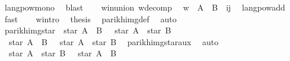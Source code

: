 \begin{isabellebody}
\ langpow{\isacharunderscore}{\kern0pt}mono\ \isamarkupfalse%
\ blast\isanewline
\ \ \isamarkupfalse%
\ w{}{\isacharunderscore}{\kern0pt}in{\isacharunderscore}{\kern0pt}union\ w{\isacharunderscore}{\kern0pt}decomp\ \isamarkupfalse%
\ {\isachardoublequoteopen}w\ {\isasymin}\ {\isacharparenleft}{\kern0pt}A\ {\isasymunion}\ B{\isacharparenright}{\kern0pt}\ {\isacharcircum}{\kern0pt}{\isacharcircum}{\kern0pt}\ {\isacharparenleft}{\kern0pt}i{\isacharplus}{\kern0pt}j{\isacharparenright}{\kern0pt}{\isachardoublequoteclose}\ \isamarkupfalse%
\ lang{\isacharunderscore}{\kern0pt}pow{\isacharunderscore}{\kern0pt}add\ \isamarkupfalse%
\ fast\isanewline
\ \ \isamarkupfalse%
\ w{\isacharunderscore}{\kern0pt}intro\ \isamarkupfalse%
\ {\isacharquery}{\kern0pt}thesis\ \isamarkupfalse%
\ parikh{\isacharunderscore}{\kern0pt}img{\isacharunderscore}{\kern0pt}def\ \isamarkupfalse%
\ auto\isanewline
{}\isamarkupfalse%
%
\endisatagproof
{\isafoldproof}%
%
\isadelimproof
\isanewline
%
\endisadelimproof
\isanewline
\isanewline
{}\isamarkupfalse%
\ parikh{\isacharunderscore}{\kern0pt}img{\isacharunderscore}{\kern0pt}star{\isacharcolon}{\kern0pt}\ {\isachardoublequoteopen}{\isasymPsi}\ {\isacharparenleft}{\kern0pt}star\ {\isacharparenleft}{\kern0pt}A\ {\isasymunion}\ B{\isacharparenright}{\kern0pt}{\isacharparenright}{\kern0pt}\ {\isacharequal}{\kern0pt}\ {\isasymPsi}\ {\isacharparenleft}{\kern0pt}star\ A\ {\isacharat}{\kern0pt}{\isacharat}{\kern0pt}\ star\ B{\isacharparenright}{\kern0pt}{\isachardoublequoteclose}\isanewline
%
\isadelimproof
%
\endisadelimproof
%
\isatagproof
{}\isamarkupfalse%
\isanewline
\ \ \isamarkupfalse%
\ {\isachardoublequoteopen}{\isasymPsi}\ {\isacharparenleft}{\kern0pt}star\ {\isacharparenleft}{\kern0pt}A\ {\isasymunion}\ B{\isacharparenright}{\kern0pt}{\isacharparenright}{\kern0pt}\ {\isasymsubseteq}\ {\isasymPsi}\ {\isacharparenleft}{\kern0pt}star\ A\ {\isacharat}{\kern0pt}{\isacharat}{\kern0pt}\ star\ B{\isacharparenright}{\kern0pt}{\isachardoublequoteclose}\ \isamarkupfalse%
\ parikh{\isacharunderscore}{\kern0pt}img{\isacharunderscore}{\kern0pt}star{\isacharunderscore}{\kern0pt}aux{}\ \isamarkupfalse%
\ auto\isanewline
\ \ \isamarkupfalse%
\ {\isachardoublequoteopen}{\isasymPsi}\ {\isacharparenleft}{\kern0pt}star\ A\ {\isacharat}{\kern0pt}{\isacharat}{\kern0pt}\ star\ B{\isacharparenright}{\kern0pt}\ {\isasymsubseteq}\ {\isasymPsi}\ {\isacharparenleft}{\kern0pt}star\ {\isacharparenleft}{\kern0pt}A\ {\isasymunion}\ B{\isacharparenright}{\kern0pt}{\isacharparenright}{\kern0pt}{\isachardoublequoteclose}\ \isamarkupfalse%

\end{isabellebody}
